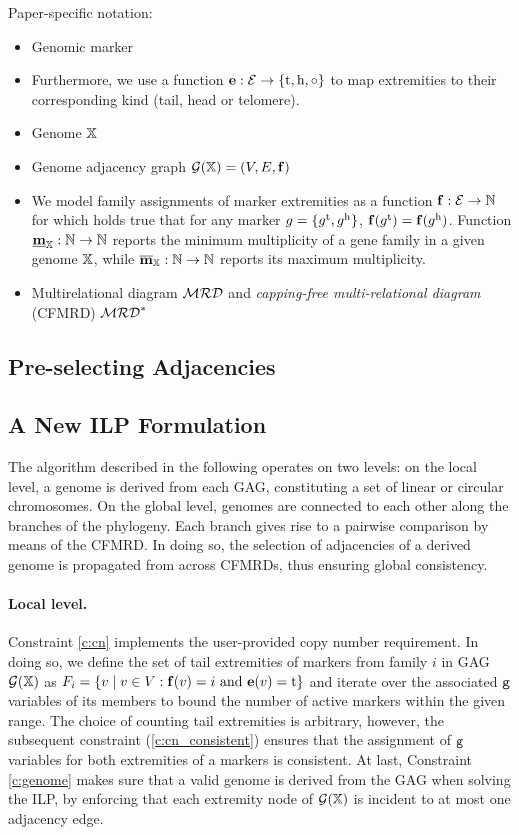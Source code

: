 \documentclass[runningheads]{llncs}
\begin{document}
Paper-specific notation:

\begin{itemize}
    \item Genomic marker 
    \item Furthermore, we use a function $\mathbf{e} : \mathcal{E} \to \{\textnormal{t}, \textnormal{h}, \circ\}$ to map extremities to their corresponding kind (tail, head or telomere). 
    \item Genome $\mathbb{X}$
    \item Genome adjacency graph $\mathcal{G}(\mathbb{X}) = (V, E, \mathbf{f})$ 
    \item 
We model family assignments of marker extremities as a function $\mathbf{f}: \mathcal{E} \to \mathbb N$ for which holds true that for any marker $g = \{g^{\textnormal{t}}, g^{\textnormal{h}}\}$, $\mathbf{f}(g^{\textnormal{t}}) = \mathbf{f}(g^{\textnormal{h}})$.  
Function 
$\underline{\mathbf{m}}_{\mathbb{X}} : \mathbb N \to \mathbb N$ reports the minimum multiplicity of a gene family in a given genome $\mathbb{X}$, while $\overline{\mathbf{m}}_{\mathbb{X}}: \mathbb N \to \mathbb N$ reports its maximum multiplicity. 
    \item Multirelational diagram $\mathcal{MRD}$ and \emph{capping-free multi-relational diagram} (CFMRD) $\mathcal{MRD}^*$
\end{itemize}
\subsection{Pre-selecting Adjacencies}
\subsection{A New ILP Formulation}
The algorithm described in the following operates on two levels: 
on the local level, a genome is derived from each GAG, constituting a set of linear or circular chromosomes. 
On the global level, genomes are connected to each other along the branches of the phylogeny. Each branch gives rise to a pairwise comparison by means of the CFMRD. 
In doing so, the selection of adjacencies of a derived genome is propagated from across CFMRDs, thus ensuring global consistency. 

\paragraph{Local level.} 
Constraint \ref{c:cn} implements the user-provided copy number requirement. 
In doing so, we define the set of tail extremities of markers from family $i$ in GAG $\mathcal{G}(\mathbb{X})$ as $F_i = \{ v \mid v \in V: \mathbf{f}(v) = i \text{ and } \mathbf{e}(v) = \textnormal{t}\}$ and iterate over the associated ${\texttt{g}}$ variables of its members to bound the number of active markers within the given range. 
The choice of counting tail extremities is arbitrary, however, the subsequent constraint (\ref{c:cn_consistent}) ensures that the assignment of ${\texttt{g}}$ variables for both extremities of a markers is consistent. 
At last, Constraint \ref{c:genome} makes sure that a valid genome is derived from the GAG when solving the ILP, by enforcing that each extremity node of $\mathcal{G}(\mathbb{X})$ is incident to at most one adjacency edge. 
\end{document}
